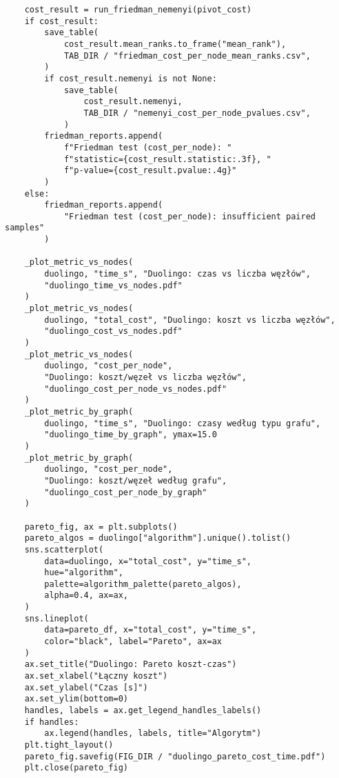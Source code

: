 \begin{verbatim}
    cost_result = run_friedman_nemenyi(pivot_cost)
    if cost_result:
        save_table(
            cost_result.mean_ranks.to_frame("mean_rank"),
            TAB_DIR / "friedman_cost_per_node_mean_ranks.csv",
        )
        if cost_result.nemenyi is not None:
            save_table(
                cost_result.nemenyi,
                TAB_DIR / "nemenyi_cost_per_node_pvalues.csv",
            )
        friedman_reports.append(
            f"Friedman test (cost_per_node): "
            f"statistic={cost_result.statistic:.3f}, "
            f"p-value={cost_result.pvalue:.4g}"
        )
    else:
        friedman_reports.append(
            "Friedman test (cost_per_node): insufficient paired samples"
        )

    _plot_metric_vs_nodes(
        duolingo, "time_s", "Duolingo: czas vs liczba węzłów",
        "duolingo_time_vs_nodes.pdf"
    )
    _plot_metric_vs_nodes(
        duolingo, "total_cost", "Duolingo: koszt vs liczba węzłów",
        "duolingo_cost_vs_nodes.pdf"
    )
    _plot_metric_vs_nodes(
        duolingo, "cost_per_node",
        "Duolingo: koszt/węzeł vs liczba węzłów",
        "duolingo_cost_per_node_vs_nodes.pdf"
    )
    _plot_metric_by_graph(
        duolingo, "time_s", "Duolingo: czasy według typu grafu",
        "duolingo_time_by_graph", ymax=15.0
    )
    _plot_metric_by_graph(
        duolingo, "cost_per_node",
        "Duolingo: koszt/węzeł według grafu",
        "duolingo_cost_per_node_by_graph"
    )

    pareto_fig, ax = plt.subplots()
    pareto_algos = duolingo["algorithm"].unique().tolist()
    sns.scatterplot(
        data=duolingo, x="total_cost", y="time_s",
        hue="algorithm",
        palette=algorithm_palette(pareto_algos),
        alpha=0.4, ax=ax,
    )
    sns.lineplot(
        data=pareto_df, x="total_cost", y="time_s",
        color="black", label="Pareto", ax=ax
    )
    ax.set_title("Duolingo: Pareto koszt-czas")
    ax.set_xlabel("Łączny koszt")
    ax.set_ylabel("Czas [s]")
    ax.set_ylim(bottom=0)
    handles, labels = ax.get_legend_handles_labels()
    if handles:
        ax.legend(handles, labels, title="Algorytm")
    plt.tight_layout()
    pareto_fig.savefig(FIG_DIR / "duolingo_pareto_cost_time.pdf")
    plt.close(pareto_fig)


\end{verbatim}
